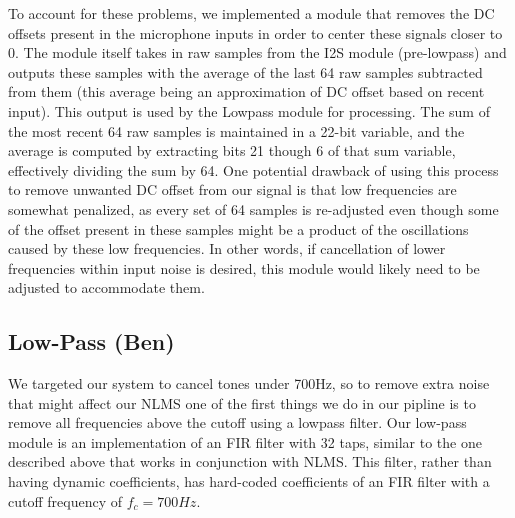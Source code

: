 \documentclass{fpgairpods}
\begin{document}
To account for these problems, we implemented a module that removes the DC offsets present in the microphone inputs in order to center these signals closer to 0. The module itself takes in raw samples from the I2S module (pre-lowpass) and outputs these samples with the average of the last 64 raw samples subtracted from them (this average being an approximation of DC offset based on recent input). This output is used by the Lowpass module for processing. The sum of the most recent 64 raw samples is maintained in a 22-bit variable, and the average is computed by extracting bits 21 though 6 of that sum variable, effectively dividing the sum by 64. One potential drawback of using this process to remove unwanted DC offset from our signal is that low frequencies are somewhat penalized, as every set of 64 samples is re-adjusted even though some of the offset present in these samples might be a product of the oscillations caused by these low frequencies. In other words, if cancellation of lower frequencies within input noise is desired, this module would likely need to be adjusted to accommodate them.

\subsection{Low-Pass (Ben)}
We targeted our system to cancel tones under 700Hz, so to remove extra noise that might affect our NLMS one of the first things we do in our pipline is to remove all frequencies above the cutoff using a lowpass filter. Our low-pass module is an implementation of an FIR filter with 32 taps, similar to the one described above that works in conjunction with NLMS. This filter, rather than having dynamic coefficients, has hard-coded coefficients of an FIR filter with a cutoff frequency of $f_c = 700Hz$.
\end{document}
